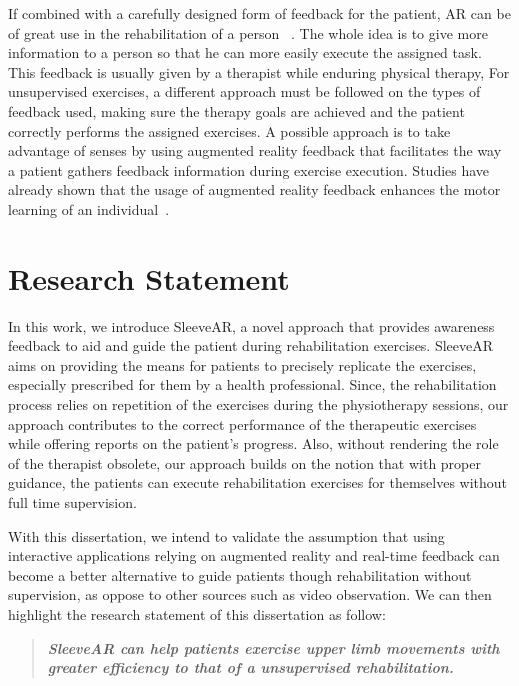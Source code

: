 If combined with a carefully designed form of feedback for the patient,
\ac{AR} can be of great use in the rehabilitation of a person ~\cite{Sigrist2013}. 
The whole idea is to give more information to a person so that he can more easily execute the assigned task.
This feedback is usually given by a therapist while enduring physical therapy, 
For unsupervised exercises, a different approach must be followed on the types of feedback used, making sure the therapy goals are achieved and the patient correctly performs the assigned exercises.
A possible approach is to take advantage of senses by using augmented reality feedback that facilitates the way a patient gathers feedback information during exercise execution. 
Studies have already shown that the usage of augmented reality feedback enhances the motor learning of an individual~\cite{Sigrist2013}.

\section{Research Statement}

In this work, we introduce SleeveAR, a novel approach that provides awareness feedback to aid and guide the patient during rehabilitation exercises.
SleeveAR aims on providing the means for patients to precisely replicate the exercises, especially prescribed for them by a health professional. 
Since, the rehabilitation process relies on repetition of the exercises during the physiotherapy sessions, our approach contributes to the correct performance of the therapeutic exercises while offering reports on the patient's progress. 
Also, without rendering the role of the therapist obsolete, our approach builds on the notion that with proper guidance, the patients can execute rehabilitation exercises for themselves without full time supervision. 

With this dissertation, we intend to validate the assumption that using interactive applications relying on augmented reality and real-time feedback can become a better alternative to guide patients though rehabilitation without supervision, as oppose to other sources such as video observation. 
We can then highlight the research statement of this dissertation as follow:


\begin{quotation}
\noindent \textit {\textbf { SleeveAR can help patients exercise upper limb movements with greater efficiency to that of a unsupervised rehabilitation.}}

\end{quotation}


